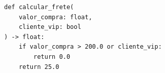 \ifmostrarGabarito
\begin{verbatim}
def calcular_frete(
    valor_compra: float,
    cliente_vip: bool
) -> float:
    if valor_compra > 200.0 or cliente_vip:
        return 0.0
    return 25.0
\end{verbatim}

\fi
